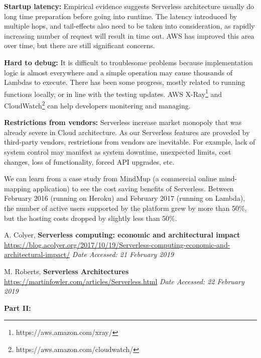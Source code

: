 \documentclass[11pt]{article}
\begin{document}
\begin{itemize*}
  \item {\bf Startup latency:} Empirical evidence suggests Serverless architecture usually do long time preparation before going into runtime. The latency introduced by multiple hops, and tail-effects also need to be taken into consideration\cite{no1}, as rapidly increasing number of request will result in time out. AWS has improved this area over time, but there are still significant concerns.
  \item {\bf Hard to debug:} It is difficult to troublesome problems because implementation logic is almost everywhere and a simple operation may cause thousands of Lambdas to execute. There has been some progress, mostly related to running functions locally, or in line with the testing updates. AWS X-Ray\footnote{https://aws.amazon.com/xray/} and CloudWatch\footnote{https://aws.amazon.com/cloudwatch/} can help developers monitering and managing. 
  \item {\bf Restrictions from vendors:} Serverless increase market monopoly that was already severe in Cloud architecture. As our Serverless features are proveded by third-party vendors, restrictions from vendors are inevitable. For example, lack of system control may manifest as system downtime, unexpected limits, cost changes, loss of functionality, forced API upgrades, etc.\cite{no2}
\end{itemize*}
We can learn from a case study from MindMup (a commercial online mind-mapping application) to see the cost saving benefits of Serverless. Between February 2016 (running on Heroku) and February 2017 (running on Lambda), the number of active users supported by the platform grew by more than 50\%, but the hosting costs dropped by slightly less than 50\%\cite{no1}. 

{\footnotesize
\begin{thebibliography}{9}
    A. Colyer, \textbf{Serverless computing: economic and architectural impact}
    \url{https://blog.acolyer.org/2017/10/19/Serverless-computing-economic-and-architectural-impact/}
    \textit{Date Accessed: 21 February 2019}
    
    M. Roberts, \textbf{Serverless Architectures}
    \url{https://martinfowler.com/articles/Serverless.html}
    \textit{Date Accessed: 22 February 2019}
\end{thebibliography}
}


{\bf Part II: }\\[10px]
  
\end{document}
